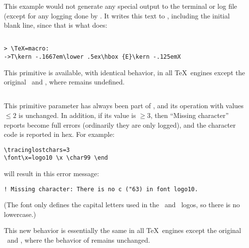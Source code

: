 \documentclass{pdftexmanual}
\begin{document}
This example would not generate any special output to the terminal or
log file (except for any logging done by . It writes
this text to , including the initial blank line,
since that is what  does:

\begin{verbatim}

> \TeX=macro:
->T\kern -.1667em\lower .5ex\hbox {E}\kern -.125emX
\end{verbatim}

This primitive is available, with identical behavior, in all \TeX\
engines except the original \TEX\ and \eTeX, where 
remains undefined. \introduced{1.40.24}

\subsection{}

This primitive parameter has always been part of \TEX, and its operation
with values $\le2$ is unchanged. In addition, if its value is
$\ge3$, then ``Missing character'' reports become full errors
(ordinarily they are only logged), and the character code is reported in
hex. For example:

\begin{verbatim}
\tracinglostchars=3
\font\x=logo10 \x \char99 \end
\end{verbatim}

\noindent will result in this error message:

\begin{verbatim}
! Missing character: There is no c ("63) in font logo10.
\end{verbatim}

\noindent (The  font only defines the capital letters used
in the \METAFONT\ and \METAPOST\ logos, so there is no lowercase.)

This new behavior is essentially the same in all \TeX\ engines except
the original \TEX\ and \eTeX, where the behavior of
 remains unchanged.


\subsection{}
\end{document}
